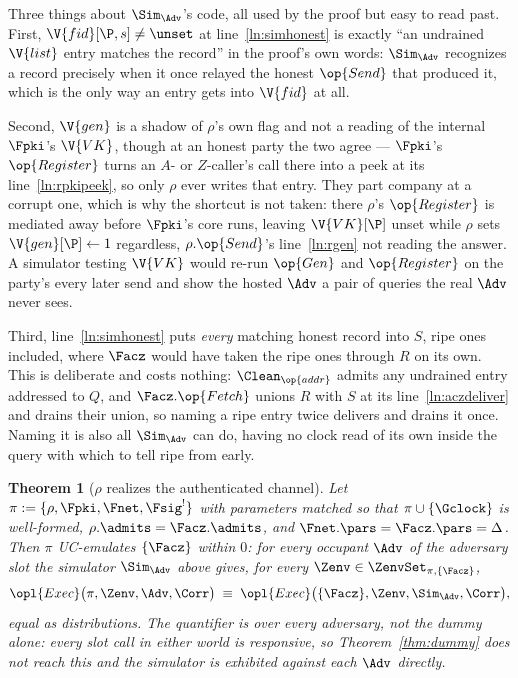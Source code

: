 \documentclass[10pt,oneside,openany]{book}
\theoremstyle{accentdef}
\theoremstyle{accentplain}
\newtheorem{theorem}[definition]{Theorem}
\begin{document}
Three things about $\Sim_{\Adv}$'s code, all used by the proof but easy to read past. First,
$\V{fid}[\P,s] \neq \unset$ at line~\ref{ln:simhonest} is exactly ``an undrained $\V{list}$ entry
matches the record'' in the proof's own words: $\Sim_{\Adv}$ recognizes a record precisely when it
once relayed the honest $\op{Send}$ that produced it, which is the only way an entry gets into
$\V{fid}$ at all.

Second, $\V{gen}$ is a shadow of $\rho$'s own flag and not a reading of the internal $\Fpki$'s
$\V{VK}$, though at an honest party the two agree --- $\Fpki$'s $\op{Register}$ turns an $A$- or
$Z$-caller's call there into a peek at its line~\ref{ln:rpkipeek}, so only $\rho$ ever writes that
entry. They part company at a corrupt one, which is why the shortcut is not taken: there $\rho$'s
$\op{Register}$ is mediated away before $\Fpki$'s core runs, leaving $\V{VK}[\P]$ unset while
$\rho$ sets $\V{gen}[\P] \gets 1$ regardless, $\rho.\op{Send}$'s line~\ref{ln:rgen} not reading
the answer. A simulator
testing $\V{VK}$ would re-run $\op{Gen}$ and $\op{Register}$ on the party's every later send and
show the hosted $\Adv$ a pair of queries the real $\Adv$ never sees.

Third, line~\ref{ln:simhonest} puts \emph{every} matching honest record into $S$, ripe ones
included, where $\Facz$ would have taken the ripe ones through $R$ on its own. This is deliberate
and costs nothing: $\Clean_{\op{addr}}$ admits any undrained entry addressed to $Q$, and
$\Facz.\op{Fetch}$ unions $R$ with $S$ at its line~\ref{ln:aczdeliver} and drains their union, so
naming a ripe entry twice delivers and drains it once. Naming it is also all $\Sim_{\Adv}$ can do, having no clock read of
its own inside the query with which to tell ripe from early.

\begin{theorem}[$\rho$ realizes the authenticated channel]\label{thm:realac}
Let $\pi := \{\rho,\Fpki,\Fnet,\Fsig^{!}\}$ with parameters matched so that $\pi \cup \{\Gclock\}$
is well-formed, $\rho.\admits = \Facz.\admits$, and $\Fnet.\pars = \Facz.\pars = \Delta$. Then
$\pi$ UC-emulates $\{\Facz\}$ within $0$: for every occupant $\Adv$ of the adversary slot the
simulator $\Sim_{\Adv}$ above gives, for every $\Zenv \in \ZenvSet_{\pi,\{\Facz\}}$,
\[
  \opl{Exec}\bigl(\pi,\Zenv,\Adv,\Corr\bigr)
  \;\equiv\;
  \opl{Exec}\bigl(\{\Facz\},\Zenv,\Sim_{\Adv},\Corr\bigr) ,
\]
equal as distributions. The quantifier is over \emph{every} adversary, not the dummy alone: every
slot call in either world is responsive, so Theorem~\ref{thm:dummy} does not reach this and the
simulator is exhibited against each $\Adv$ directly.
\end{theorem}
\end{document}
